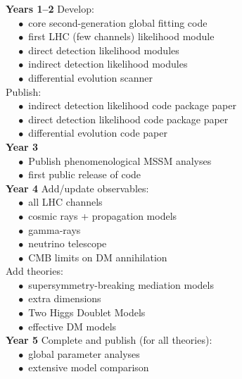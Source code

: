 \documentclass[11pt,oneside,twocolumn,a4paper]{article}
\begin{document}
\noindent\textbf{Years 1--2} Develop:\\
$\phantom{xx}\bullet$ core second-generation global fitting code\\
$\phantom{xx}\bullet$ first LHC (few channels) likelihood module\\ 
$\phantom{xx}\bullet$ direct detection likelihood modules\\
$\phantom{xx}\bullet$ indirect detection likelihood modules\\
$\phantom{xx}\bullet$ differential evolution scanner\\
Publish:\\
$\phantom{xx}\bullet$ indirect detection likelihood code package paper\\
$\phantom{xx}\bullet$ direct detection likelihood code package paper\\
$\phantom{xx}\bullet$ differential evolution code paper\\
\noindent\textbf{Year 3}\\ 
$\phantom{xx}\bullet$ Publish phenomenological MSSM analyses\\
$\phantom{xx}\bullet$ first public release of code\\
\noindent\textbf{Year 4} Add/update observables:\\
$\phantom{xx}\bullet$ all LHC channels\\
$\phantom{xx}\bullet$ cosmic rays + propagation models\\
$\phantom{xx}\bullet$ gamma-rays\\
$\phantom{xx}\bullet$ neutrino telescope\\
$\phantom{xx}\bullet$ CMB limits on DM annihilation\\
Add theories:\\
$\phantom{xx}\bullet$ supersymmetry-breaking mediation models\\
$\phantom{xx}\bullet$ extra dimensions\\
$\phantom{xx}\bullet$ Two Higgs Doublet Models\\
$\phantom{xx}\bullet$ effective DM models\\
\noindent\textbf{Year 5} Complete and publish (for all theories):\\ 
$\phantom{xx}\bullet$ global parameter analyses\\
$\phantom{xx}\bullet$ extensive model comparison
\end{document}
